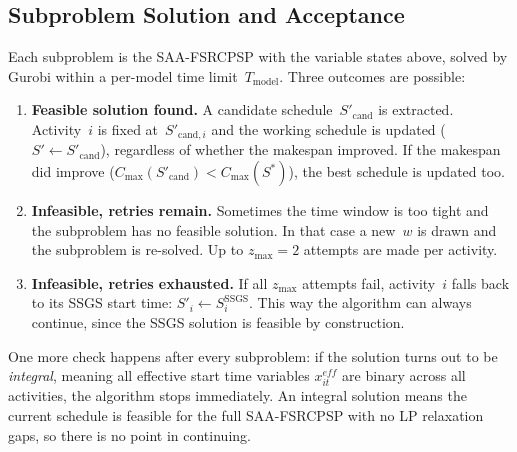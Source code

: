 \subsection{Subproblem Solution and Acceptance}
\label{subsec:subproblem}
Each subproblem is the SAA-FSRCPSP with the variable states above,
solved by Gurobi \parencite{gurobi2024} within a per-model time
limit~$T_{\mathrm{model}}$. Three outcomes are possible:
\begin{enumerate}
    \item \textbf{Feasible solution found.} A candidate
          schedule~$S'_{\mathrm{cand}}$ is extracted. Activity~$i$
          is fixed at~$S'_{\mathrm{cand},i}$ and the working
          schedule is updated ($S' \leftarrow S'_{\mathrm{cand}}$),
          regardless of whether the makespan improved. If the
          makespan did improve
          ($C_{\max}(S'_{\mathrm{cand}}) < C_{\max}(S^*)$), the
          best schedule is updated too.
    \item \textbf{Infeasible, retries remain.} Sometimes the time
          window is too tight and the subproblem has no feasible
          solution. In that case a new~$w$ is drawn and the
          subproblem is re-solved. Up to $z_{\max} = 2$ attempts are
          made per activity.
    \item \textbf{Infeasible, retries exhausted.} If all
          $z_{\max}$ attempts fail, activity~$i$ falls back to its
          SSGS start time:
          $S'_i \leftarrow S^{\mathrm{SSGS}}_i$. This way the
          algorithm can always continue, since the SSGS solution is
          feasible by construction.
\end{enumerate}
One more check happens after every subproblem: if the solution
turns out to be \textit{integral}, meaning all effective start time
variables $x^{eff}_{it}$ are binary across all activities, the
algorithm stops immediately. An integral solution means the current
schedule is feasible for the full SAA-FSRCPSP with no LP relaxation
gaps, so there is no point in continuing.
